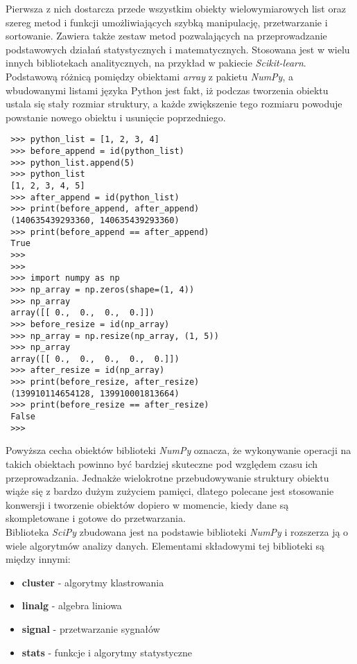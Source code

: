 Pierwsza z nich dostarcza przede wszystkim obiekty wielowymiarowych list oraz szereg metod i funkcji umożliwiających szybką manipulację, przetwarzanie i sortowanie.
Zawiera także zestaw metod pozwalających na przeprowadzanie podstawowych działań statystycznych i matematycznych\cite{numpy_ug}. Stosowana jest w wielu innych bibliotekach analitycznych, na przykład w pakiecie \textit{Scikit-learn}.\\

Podstawową różnicą pomiędzy obiektami \textit{array} z pakietu \textit{NumPy}, a wbudowanymi listami języka Python jest fakt, iż podczas tworzenia obiektu ustala się stały rozmiar struktury, 
a każde zwiększenie tego rozmiaru powoduje powstanie nowego obiektu i usunięcie poprzedniego.
\begin{lstlisting}
 >>> python_list = [1, 2, 3, 4]
 >>> before_append = id(python_list)
 >>> python_list.append(5)
 >>> python_list
 [1, 2, 3, 4, 5]
 >>> after_append = id(python_list)
 >>> print(before_append, after_append)
 (140635439293360, 140635439293360)
 >>> print(before_append == after_append)
 True
 >>> 
 >>> 
 >>> import numpy as np
 >>> np_array = np.zeros(shape=(1, 4))
 >>> np_array
 array([[ 0.,  0.,  0.,  0.]])
 >>> before_resize = id(np_array)
 >>> np_array = np.resize(np_array, (1, 5))
 >>> np_array
 array([[ 0.,  0.,  0.,  0.,  0.]])
 >>> after_resize = id(np_array)
 >>> print(before_resize, after_resize)
 (139910114654128, 139910001813664)
 >>> print(before_resize == after_resize)
 False
 >>> 
\end{lstlisting}

Powyższa cecha obiektów biblioteki \textit{NumPy} oznacza, że wykonywanie operacji na takich obiektach powinno być bardziej skuteczne pod względem czasu ich przeprowadzania.
Jednakże wielokrotne przebudowywanie struktury obiektu wiąże się z bardzo dużym zużyciem pamięci, dlatego polecane jest stosowanie konwersji i tworzenie obiektów dopiero w momencie, kiedy dane są skompletowane i gotowe do przetwarzania\cite{numpy_ug}.\\

Biblioteka \textit{SciPy} zbudowana jest na podstawie biblioteki \textit{NumPy} i rozszerza ją o wiele algorytmów analizy danych.
Elementami składowymi tej biblioteki są między innymi\cite{numpy_ug}:
\begin{itemize}
 \item \textbf{cluster} - algorytmy klastrowania
 \item \textbf{linalg} - algebra liniowa
 \item \textbf{signal} - przetwarzanie sygnałów
 \item \textbf{stats} - funkcje i algorytmy statystyczne\\
\end{itemize}


